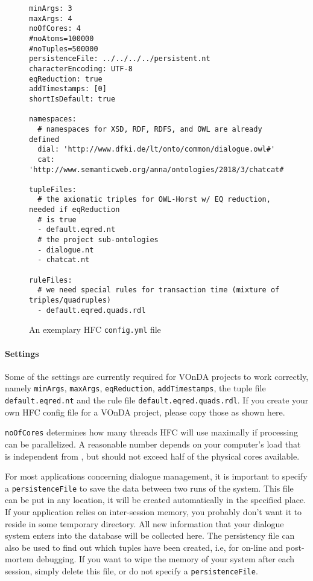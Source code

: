 \begin{figure} [htb]
\small%
\begin{lstlisting}[style=yaml]
minArgs: 3
maxArgs: 4
noOfCores: 4
#noAtoms=100000
#noTuples=500000
persistenceFile: ../../../../persistent.nt
characterEncoding: UTF-8
eqReduction: true
addTimestamps: [0]
shortIsDefault: true

namespaces:
  # namespaces for XSD, RDF, RDFS, and OWL are already defined
  dial: 'http://www.dfki.de/lt/onto/common/dialogue.owl#'
  cat: 'http://www.semanticweb.org/anna/ontologies/2018/3/chatcat#'

tupleFiles:
  # the axiomatic triples for OWL-Horst w/ EQ reduction, needed if eqReduction
  # is true
  - default.eqred.nt
  # the project sub-ontologies
  - dialogue.nt
  - chatcat.nt

ruleFiles:
  # we need special rules for transaction time (mixture of triples/quadruples)
  - default.eqred.quads.rdl
\end{lstlisting}
\caption{An exemplary HFC \texttt{config.yml} file}
\label{fig:hfcconfig}
\end{figure}

\paragraph{Settings}

Some of the settings are currently required for VOnDA projects to work
correctly, namely \texttt{minArgs}, \texttt{maxArgs},
\texttt{eqReduction}, \texttt{addTimestamps}, the tuple file
\texttt{default.eqred.nt} and the rule file
\texttt{default.eqred.quads.rdl}. If you create your own HFC config
file for a VOnDA project, please copy those as shown here.

\texttt{noOfCores} determines how many threads HFC will use maximally
if processing can be parallelized. A reasonable number depends on your
computer's load that is independent from \vonda, but should not exceed
half of the physical cores available.

For most applications concerning dialogue management, it is important to
specify a \texttt{persistenceFile} to save the data between two runs of the
system. This file can be put in any location, it will be created automatically
in the specified place. If your application relies on inter-session memory,
you probably don't want it to reside in some temporary directory. All new
information that your dialogue system enters into the database will be
collected here. The persistency file can also be used to find out which tuples
have been created, i.e, for on-line and post-mortem debugging. If you want to
wipe the memory of your system after each session, simply delete this
file, or do not specify a \texttt{persistenceFile}.


